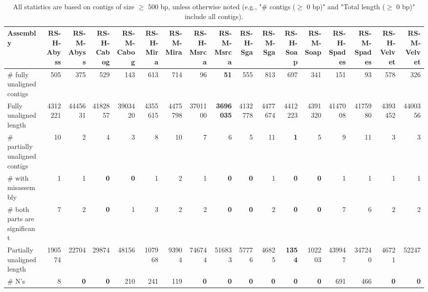 \documentclass[12pt,a4paper]{article}
\begin{document}
\begin{table}[ht]
\begin{center}
\caption{All statistics are based on contigs of size $\geq$ 500 bp, unless otherwise noted (e.g., "\# contigs ($\geq$ 0 bp)" and "Total length ($\geq$ 0 bp)" include all contigs).}
\begin{tabular}{|l*{16}{|r}|}
\hline
Assembly & RS-H-Abyss & RS-M-Abyss & RS-H-Cabog & RS-M-Cabog & RS-H-Mira & RS-M-Mira & RS-H-Msrca & RS-M-Msrca & RS-H-Sga & RS-M-Sga & RS-H-Soap & RS-M-Soap & RS-H-Spades & RS-M-Spades & RS-H-Velvet & RS-M-Velvet \\ \hline
\# fully unaligned contigs & 505 & 375 & 529 & 143 & 613 & 714 & 96 & {\bf 51} & 555 & 813 & 697 & 341 & 151 & 93 & 578 & 326 \\ \hline
Fully unaligned length & 4312221 & 4445631 & 4182857 & 3903420 & 4355615 & 4475798 & 3701100 & {\bf 3696035} & 4132778 & 4477674 & 4412223 & 4391320 & 4147008 & 4175980 & 4393452 & 4400356 \\ \hline
\# partially unaligned contigs & 10 & 2 & 4 & 3 & 8 & 10 & 7 & 6 & 5 & 11 & {\bf 1} & 5 & 9 & 11 & 3 & 3 \\ \hline
\hspace{5mm}\# with misassembly & 1 & 1 & {\bf 0} & {\bf 0} & 1 & 2 & 1 & {\bf 0} & {\bf 0} & 1 & {\bf 0} & {\bf 0} & 1 & 1 & 1 & 1 \\ \hline
\hspace{5mm}\# both parts are significant & 7 & 2 & {\bf 0} & 1 & 3 & 2 & 2 & {\bf 0} & {\bf 0} & 2 & {\bf 0} & {\bf 0} & 7 & 6 & 2 & 2 \\ \hline
Partially unaligned length & 190574 & 22704 & 29874 & 48156 & 107968 & 93904 & 746744 & 516833 & 57776 & 46825 & {\bf 1354} & 102203 & 439947 & 347240 & 46721 & 52247 \\ \hline
\# N's & 8 & {\bf 0} & {\bf 0} & 210 & 241 & 119 & {\bf 0} & {\bf 0} & {\bf 0} & {\bf 0} & {\bf 0} & {\bf 0} & 691 & 466 & {\bf 0} & {\bf 0} \\ \hline
\end{tabular}
\end{center}
\end{table}
\end{document}
